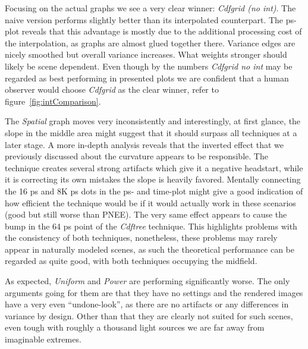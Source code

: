 Focusing on the actual graphs we see a very clear winner: \textit{Cdfgrid (no int)}. The naive version performs slightly better than its interpolated counterpart. The ps-plot reveals that this advantage is mostly due to the additional processing cost of the interpolation, as graphs are almost glued together there. Variance edges are nicely smoothed but overall variance increases. What weights stronger should likely be scene dependent. Even though by the numbers \textit{Cdfgrid no int} may be regarded as best performing in presented plots we are confident that a human observer would choose \textit{Cdfgrid} as the clear winner, refer to figure~\ref{fig:intComparison}.

The \textit{Spatial} graph moves very inconsistently and interestingly, at first glance, the slope in the middle area might suggest that it should surpass all techniques at a later stage. A more in-depth analysis reveals that the inverted effect that we previously discussed about the curvature appears to be responsible. The technique creates several strong artifacts which give it a negative headstart, while it is correcting its own mistakes the slope is heavily favored. Mentally connecting the 16 ps and 8K ps dots in the ps- and time-plot might give a good indication of how efficient the technique would be if it would actually work in these scenarios (good but still worse than PNEE). The very same effect appears to cause the bump in the 64 ps point of the \textit{Cdftree} technique. This highlights problems with the consistency of both techniques, nonetheless, these problems may rarely appear in naturally modeled scenes, as such the theoretical performance can be regarded as quite good, with both techniques occupying the midfield. 

As expected, \textit{Uniform} and \textit{Power} are performing significantly worse. The only arguments going for them are that they have no settings and the rendered images have a very even \enquote{undone-look}, as there are no artifacts or any differences in variance by design. Other than that they are clearly not suited for such scenes, even tough with roughly a thousand light sources we are far away from imaginable extremes.

